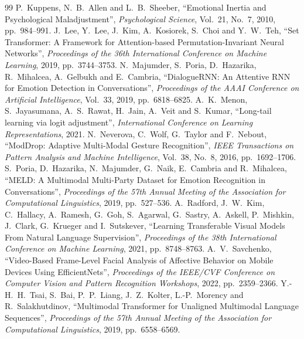 \begin{thebibliography}{99}
 P.~Kuppens, N.~B.~Allen and L.~B.~Sheeber, ``Emotional Inertia and Psychological Maladjustment'', \emph{Psychological Science}, Vol.~21, No.~7, 2010, pp.~984--991.
 J.~Lee, Y.~Lee, J.~Kim, A.~Kosiorek, S.~Choi and Y.~W.~Teh, ``Set Transformer: A Framework for Attention-based Permutation-Invariant Neural Networks'', \emph{Proceedings of the 36th International Conference on Machine Learning}, 2019, pp.~3744--3753.
 N.~Majumder, S.~Poria, D.~Hazarika, R.~Mihalcea, A.~Gelbukh and E.~Cambria, ``{DialogueRNN}: An Attentive {RNN} for Emotion Detection in Conversations'', \emph{Proceedings of the AAAI Conference on Artificial Intelligence}, Vol.~33, 2019, pp.~6818--6825.
 A.~K.~Menon, S.~Jayasumana, A.~S.~Rawat, H.~Jain, A.~Veit and S.~Kumar, ``Long-tail learning via logit adjustment'', \emph{International Conference on Learning Representations}, 2021.
 N.~Neverova, C.~Wolf, G.~Taylor and F.~Nebout, ``{ModDrop}: Adaptive Multi-Modal Gesture Recognition'', \emph{IEEE Transactions on Pattern Analysis and Machine Intelligence}, Vol.~38, No.~8, 2016, pp.~1692--1706.
 S.~Poria, D.~Hazarika, N.~Majumder, G.~Naik, E.~Cambria and R.~Mihalcea, ``{MELD}: A Multimodal Multi-Party Dataset for Emotion Recognition in Conversations'', \emph{Proceedings of the 57th Annual Meeting of the Association for Computational Linguistics}, 2019, pp.~527--536.
 A.~Radford, J.~W.~Kim, C.~Hallacy, A.~Ramesh, G.~Goh, S.~Agarwal, G.~Sastry, A.~Askell, P.~Mishkin, J.~Clark, G.~Krueger and I.~Sutskever, ``Learning Transferable Visual Models From Natural Language Supervision'', \emph{Proceedings of the 38th International Conference on Machine Learning}, 2021, pp.~8748--8763.
 A.~V.~Savchenko, ``Video-Based Frame-Level Facial Analysis of Affective Behavior on Mobile Devices Using {EfficientNets}'', \emph{Proceedings of the IEEE/CVF Conference on Computer Vision and Pattern Recognition Workshops}, 2022, pp.~2359--2366.
 Y.-H.~H.~Tsai, S.~Bai, P.~P.~Liang, J.~Z.~Kolter, L.-P.~Morency and R.~Salakhutdinov, ``Multimodal Transformer for Unaligned Multimodal Language Sequences'', \emph{Proceedings of the 57th Annual Meeting of the Association for Computational Linguistics}, 2019, pp.~6558--6569.

\end{thebibliography}
